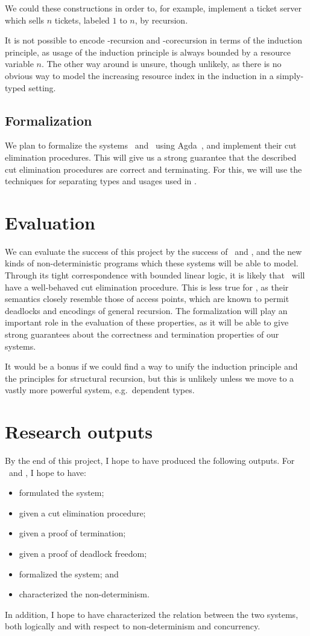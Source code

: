 \documentclass[twocolumn]{article}
\begin{document}
We could these constructions in order to, for example, implement a ticket server
which sells $n$ tickets, labeled $1$ to $n$, by recursion.

It is not possible to encode  \textmu-recursion and \textnu-corecursion in terms
of the induction principle, as usage of the induction principle is always
bounded by a resource variable $n$.
The other way around is unsure, though unlikely, as there is no obvious way to
model the increasing resource index in the induction in a simply-typed setting.

\subsection{Formalization}
We plan to formalize the systems \gtcp\ and \ndcp\ using
Agda~\citep{norell2009}, and implement their cut elimination procedures. This
will give us a strong guarantee that the described cut elimination procedures
are correct and terminating. For this, we will use the techniques for separating
types and usages used in \citet{mcbride2016}. 

\section{Evaluation}
We can evaluate the success of this project by the success of \gtcp\ and \ndcp,
and the new kinds of non-deterministic programs which these systems will be able
to model.
Through its tight correspondence with bounded linear logic, it is likely 
that \gtcp\ will have a well-behaved cut elimination procedure.
This is less true for \ndcp, as their semantics closely resemble those of access
points, which are known to permit deadlocks and encodings of general recursion.
The formalization will play an important role in the evaluation of these
properties, as it will be able to give strong guarantees about the correctness
and termination properties of our systems.

It would be a bonus if we could find a way to unify the induction principle and
the principles for structural recursion, but this is unlikely unless we move to
a vastly more powerful system, e.g.\ dependent types.

\section{Research outputs}
By the end of this project, I hope to have produced the following outputs.
For \gtcp\ and \ndcp, I hope to have:
\begin{itemize}[noitemsep]
\item formulated the system;
\item given a cut elimination procedure;
\item given a proof of termination;
\item given a proof of deadlock freedom;
\item formalized the system; and
\item characterized the non-determinism.
\end{itemize}
In addition, I hope to have characterized the relation between the two systems,
both logically and with respect to non-determinism and concurrency.
\end{document}
